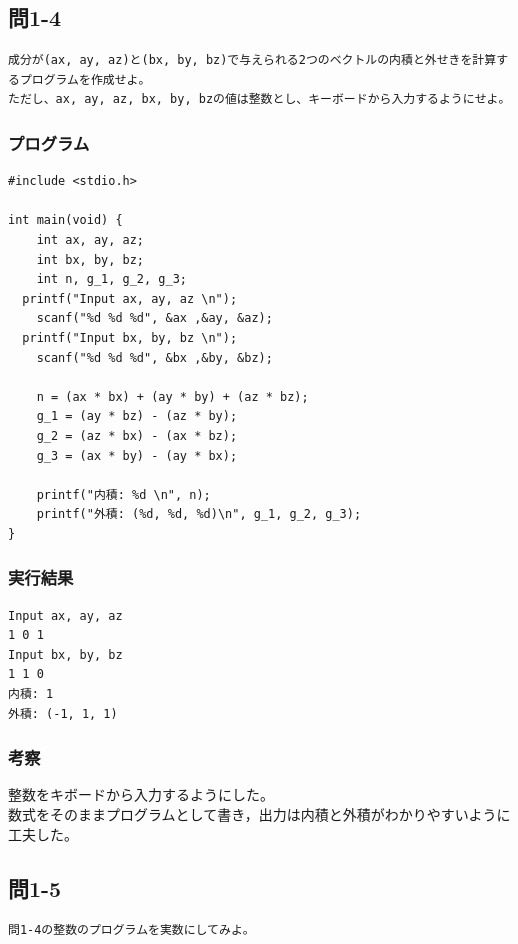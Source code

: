 \documentclass{jarticle}
\begin{document}
\subsection{問1-4\\}
\begin{verbatim}
成分が(ax, ay, az)と(bx, by, bz)で与えられる2つのベクトルの内積と外せきを計算するプログラムを作成せよ。
ただし、ax, ay, az, bx, by, bzの値は整数とし、キーボードから入力するようにせよ。
\end{verbatim}
\subsubsection{プログラム\\}
\begin{breakbox}
\begin{verbatim}
#include <stdio.h>

int main(void) {
	int ax, ay, az;
	int bx, by, bz;
	int n, g_1, g_2, g_3;
  printf("Input ax, ay, az \n");
	scanf("%d %d %d", &ax ,&ay, &az);
  printf("Input bx, by, bz \n");
	scanf("%d %d %d", &bx ,&by, &bz);
  
	n = (ax * bx) + (ay * by) + (az * bz); 
	g_1 = (ay * bz) - (az * by); 
	g_2 = (az * bx) - (ax * bz); 
	g_3 = (ax * by) - (ay * bx);

	printf("内積: %d \n", n);
	printf("外積: (%d, %d, %d)\n", g_1, g_2, g_3); 
}
\end{verbatim}
\end{breakbox}
\subsubsection{実行結果\\}
\begin{breakbox}
\begin{verbatim}
Input ax, ay, az 
1 0 1
Input bx, by, bz 
1 1 0
内積: 1 
外積: (-1, 1, 1)
\end{verbatim}
\end{breakbox}
\subsubsection{考察\\}
整数をキボードから入力するようにした。\\
数式をそのままプログラムとして書き，出力は内積と外積がわかりやすいように工夫した。\\


\subsection{問1-5\\}
\begin{verbatim}
問1-4の整数のプログラムを実数にしてみよ。
\end{verbatim}
\end{document}
